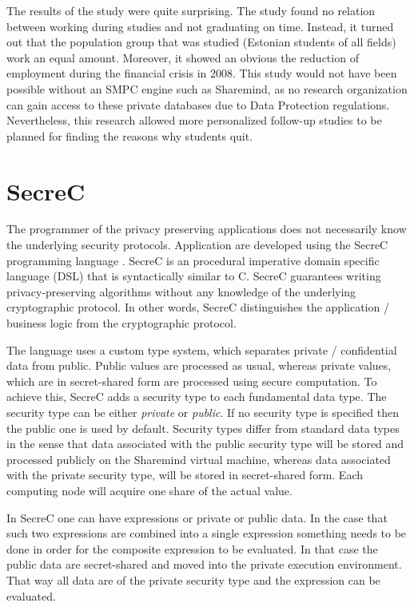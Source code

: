 The results of the study were quite surprising.
The study found no relation between working during studies and not graduating on time.
Instead, it turned out that the population group that was studied (Estonian students of all fields) work an equal amount.
Moreover, it showed an obvious the reduction of employment during the financial crisis in 2008.
This study would not have been possible without an SMPC engine such as Sharemind, as no research organization can gain access to these private databases due to Data Protection regulations.
Nevertheless, this research allowed more personalized follow-up studies to be planned for finding the reasons why students quit.



\section{SecreC}\label{s:secrec}

The programmer of the privacy preserving applications does not necessarily know the underlying security protocols.
Application are developed using the SecreC programming language \cite{jagomagis2010secrec}.
SecreC is an procedural imperative domain specific language (DSL) that is syntactically similar to C. SecreC guarantees writing privacy-preserving algorithms without any knowledge of the underlying cryptographic protocol.
In other words, SecreC distinguishes the application / business logic from the cryptographic protocol.

The language uses a custom type system, which separates private / confidential data from public.
Public values are processed as usual, whereas private values, which are in secret-shared form are processed using secure computation.
To achieve this, SecreC adds a security type to each fundamental data type.
The security type can be either \textit{private} or \textit{public}.
If no security type is specified then the public one is used by default.
Security types differ from standard data types in the sense that data associated with the public security type will be stored and processed publicly on the Sharemind virtual machine, whereas data associated with the private security type, will be stored in secret\hyp shared form.
Each computing node will acquire one share of the actual value.

In SecreC one can have expressions or private or public data.
In the case that such two expressions are combined into a single expression something needs to be done in order for the composite expression to be evaluated.
In that case the public data are secret\hyp shared and moved into the private execution environment.
That way all data are of the private security type and the expression can be evaluated.

